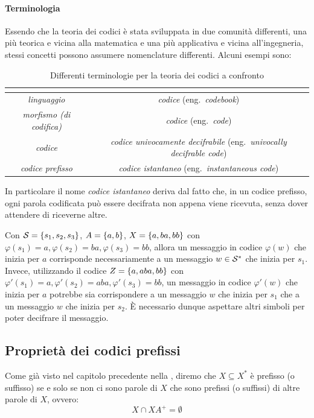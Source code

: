 \paragraph{Terminologia}
Essendo che la teoria dei codici è stata sviluppata in due comunità differenti, una più teorica e vicina alla matematica e una più applicativa e vicina all'ingegneria, stessi concetti possono assumere nomenclature differenti.
Alcuni esempi sono:
\begin{table}[H]
\centering
\begin{tabular}{|c|c|}
\hline
\textbf{\q{Matematica}} & \textbf{\q{Ingegneria}} \\
\hline
\emph{linguaggio} & \emph{codice} (eng.\ \emph{codebook}) \\
\emph{morfismo (di codifica)} & \emph{codice} (eng.\ \emph{code}) \\
\emph{codice} & \emph{codice univocamente decifrabile} (eng.\ \emph{univocally decifrable code}) \\
\emph{codice prefisso} & \emph{codice istantaneo} (eng.\ \emph{instantaneous code}) \\
\hline
\end{tabular}
\caption{Differenti terminologie per la teoria dei codici a confronto}\label{tab:code_theory_terms}
\end{table}

In particolare il nome \emph{codice istantaneo} deriva dal fatto che, in un codice prefisso, ogni parola codificata può essere decifrata non appena viene ricevuta, senza dover attendere di riceverne altre.

\begin{example}{}
  Con \(\SCal = \set{s_1,s_2,s_3}\), \(A = \set{a,b}\), \(X = \set{a,ba,bb}\) con \(\varphi(s_1) = a, \varphi(s_2) = ba, \varphi(s_3) = bb\), allora un messaggio in codice \(\varphi(w)\) che inizia per \(a\) corrisponde necessariamente a un messaggio \(w \in \mathcal{S}^*\) che inizia per \(s_1\).
  Invece, utilizzando il codice \(Z = \set{a,aba,bb}\) con \(\varphi'(s_1) = a, \varphi'(s_2) = aba, \varphi'(s_3) = bb\), un messaggio in codice \(\varphi'(w)\) che inizia per \(a\) potrebbe sia corrispondere a un messaggio \(w\) che inizia per \(s_1\) che a un messaggio \(w\) che inizia per \(s_2\).
  È necessario dunque aspettare altri simboli per poter decifrare il messaggio.
\end{example}

\subsection{Proprietà dei codici prefissi}
Come già visto nel capitolo precedente nella , diremo che \(X \subseteq X^*\) è prefisso (o suffisso) se e solo se non ci sono parole di \(X\) che sono prefissi (o suffissi) di altre parole di \(X\), ovvero:
\[X\cap XA^+ = \emptyset\]

